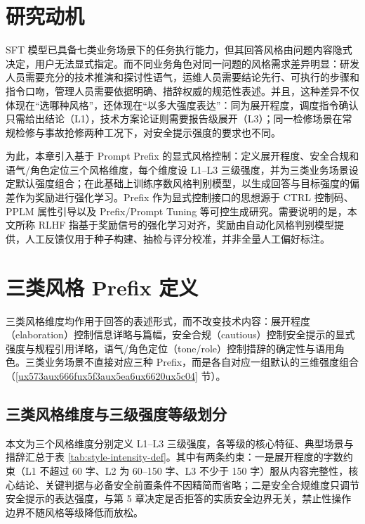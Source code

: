 \documentclass[fontset=fandol,type=master,campus=shenzhen,etitleauto=true]{hithesisbook}
\begin{document}
\section{研究动机}\label{ux7814ux7a76ux52a8ux673a-1}

SFT 模型已具备七类业务场景下的任务执行能力，但其回答风格由问题内容隐式决定，用户无法显式指定。而不同业务角色对同一问题的风格需求差异明显：研发人员需要充分的技术推演和探讨性语气，运维人员需要结论先行、可执行的步骤和指令口吻，管理人员需要依据明确、措辞权威的规范性表述。并且，这种差异不仅体现在“选哪种风格”，还体现在“以多大强度表达”：同为展开程度，调度指令确认只需给出结论（L1），技术方案论证则需要报告级展开（L3）；同一检修场景在常规检修与事故抢修两种工况下，对安全提示强度的要求也不同。

为此，本章引入基于 Prompt Prefix 的显式风格控制：定义展开程度、安全合规和语气/角色定位三个风格维度，每个维度设 L1--L3 三级强度，并为三类业务场景设定默认强度组合；在此基础上训练序数风格判别模型，以生成回答与目标强度的偏差作为奖励进行强化学习。Prefix 作为显式控制接口的思想源于 CTRL 控制码、PPLM 属性引导以及 Prefix/Prompt Tuning 等可控生成研究\cite{ref36,ref37,ref38,ref39}。需要说明的是，本文所称 RLHF 指基于奖励信号的强化学习对齐，奖励由自动化风格判别模型提供，人工反馈仅用于种子构建、抽检与评分校准，并非全量人工偏好标注。

\section{三类风格 Prefix 定义}\label{ux4e09ux7c7bux98ceux683c-prefix-ux5b9aux4e49}

三类风格维度均作用于回答的表述形式，而不改变技术内容：展开程度（elaboration）控制信息详略与篇幅，安全合规（cautious）控制安全提示的显式强度与规程引用详略，语气/角色定位（tone/role）控制措辞的确定性与语用角色。三类业务场景不直接对应三种 Prefix，而是各自对应一组默认的三维强度组合（\ref{ux573aux666fux5f3aux5ea6ux6620ux5c04} 节）。

\subsection{三类风格维度与三级强度等级划分}\label{ux98ceux683cux5f3aux5ea6ux7b49ux7ea7ux5212ux5206}

本文为三个风格维度分别定义 L1--L3 三级强度，各等级的核心特征、典型场景与措辞汇总于表 \ref{tab:style-intensity-def}。其中有两条约束：一是展开程度的字数约束（L1 不超过 60 字、L2 为 60--150 字、L3 不少于 150 字）服从内容完整性，核心结论、关键判据与必备安全前置条件不因精简而省略；二是安全合规维度只调节安全提示的表达强度，与第 5 章决定是否拒答的实质安全边界无关，禁止性操作边界不随风格等级降低而放松。
\end{document}

